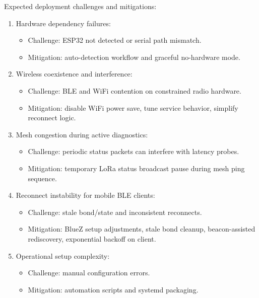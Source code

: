 \documentclass[conference]{IEEEtran}
\begin{document}
Expected deployment challenges and mitigations:
\begin{enumerate}
\item Hardware dependency failures:
\begin{itemize}
\item Challenge: ESP32 not detected or serial path mismatch.
\item Mitigation: auto-detection workflow and graceful no-hardware mode.
\end{itemize}
\item Wireless coexistence and interference:
\begin{itemize}
\item Challenge: BLE and WiFi contention on constrained radio hardware.
\item Mitigation: disable WiFi power save, tune service behavior, simplify reconnect logic.
\end{itemize}
\item Mesh congestion during active diagnostics:
\begin{itemize}
\item Challenge: periodic status packets can interfere with latency probes.
\item Mitigation: temporary LoRa status broadcast pause during mesh ping sequence.
\end{itemize}
\item Reconnect instability for mobile BLE clients:
\begin{itemize}
\item Challenge: stale bond/state and inconsistent reconnects.
\item Mitigation: BlueZ setup adjustments, stale bond cleanup, beacon-assisted rediscovery, exponential backoff on client.
\end{itemize}
\item Operational setup complexity:
\begin{itemize}
\item Challenge: manual configuration errors.
\item Mitigation: automation scripts and systemd packaging.
\end{itemize}
\end{enumerate}
\end{document}
